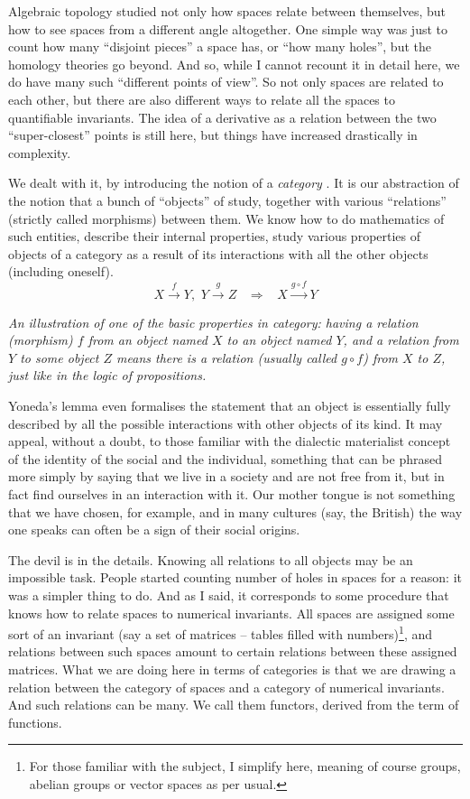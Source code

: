 \documentclass{article}
\begin{document}
Algebraic topology studied not only how spaces relate between themselves, but how to see spaces from a different angle altogether. One simple way was just to count how many “disjoint pieces” a space has, or “how many holes”, but the homology theories go beyond. And so, while I cannot recount it in detail here, we do have many such “different points of view”. So not only spaces are related to each other, but there are also different ways to relate all the spaces to quantifiable invariants. The idea of a derivative as a relation between the two “super-closest” points is still here, but things have increased drastically in complexity.

We dealt with it, by introducing the notion of a \emph{category} \cite{EILMAC,MACLANE}. It is our abstraction of the notion that a bunch of “objects” of study, together with various “relations” (strictly called morphisms) between them. We know how to do mathematics of such entities, describe their internal properties, study various properties of objects of a category as a result of its interactions with all the other objects (including oneself).
$$
X \stackrel f \longrightarrow Y, \, \, Y \stackrel g \longrightarrow Z \, \, \, \, \, \Rightarrow \, \, \, \, \, X \stackrel{g \circ f}{\longrightarrow} Y
$$
\begin{center}
\textit{An illustration of one of the basic properties in category: having a relation (morphism) $f$ from an object named $X$ to an object named $Y$, and a relation from $Y$ to some object $Z$ means there is a relation (usually called $g \circ f$) from $X$ to $Z$, just like in the logic of propositions.}
\end{center}


Yoneda’s lemma \cite{MACLANE} even formalises the statement that an object is essentially fully described by all the possible interactions with other objects of its kind. It may appeal, without a doubt, to those familiar with the dialectic materialist concept of the identity of the social and the individual, something that can be phrased more simply by saying that we live in a society and are not free from it, but in fact find ourselves in an interaction with it. Our mother tongue is not something that we have chosen, for example, and in many cultures (say, the British) the way one speaks can often be a sign of their social origins.

The devil is in the details. Knowing all relations to all objects may be an impossible task. People started counting number of holes in spaces for a reason: it was a simpler thing to do. And as I said, it corresponds to some procedure that knows how to relate spaces to numerical invariants. All spaces are assigned some sort of an invariant (say a set of matrices – tables filled with numbers)\footnote{For those familiar with the subject, I simplify here, meaning of course groups, abelian groups or vector spaces as per usual.}, and relations between such spaces amount to certain relations between these assigned matrices. What we are doing here in terms of categories is that we are drawing a relation between the category of spaces and a category of numerical invariants. And such relations can be many. We call them functors, derived from the term of functions.
\end{document}
